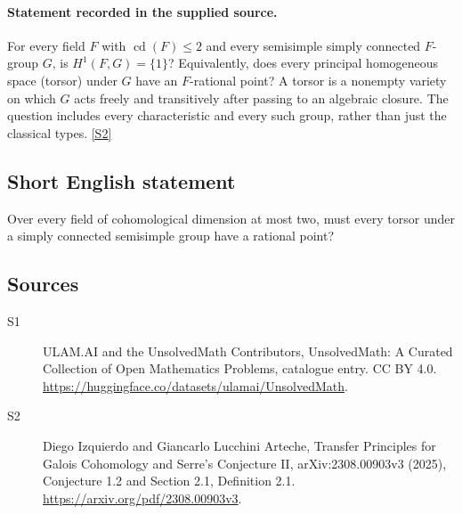 \documentclass[11pt]{article}
\newcommand{\sref}[2]{\hyperlink{source:#1:#2}{[S#2]}}
\begin{document}
\paragraph{Statement recorded in the supplied source.}
For every field $F$ with $\operatorname{cd}(F)\le2$ and every semisimple simply connected $F$-group $G$, is $H^1(F,G)=\{1\}$? Equivalently, does every principal homogeneous space (torsor) under $G$ have an $F$-rational point? A torsor is a nonempty variety on which $G$ acts freely and transitively after passing to an algebraic closure. The question includes every characteristic and every such group, rather than just the classical types. \sref{statement}{2}
\subsection{Short English statement}
Over every field of cohomological dimension at most two, must every torsor under a simply connected semisimple group have a rational point?
\subsection{Sources}
\begin{description}
\item[\hypertarget{source:statement:1}{S1}] ULAM.AI and the UnsolvedMath Contributors, UnsolvedMath: A Curated Collection of Open Mathematics Problems, catalogue entry. CC BY 4.0. \url{https://huggingface.co/datasets/ulamai/UnsolvedMath}.
\item[\hypertarget{source:statement:2}{S2}] Diego Izquierdo and Giancarlo Lucchini Arteche, Transfer Principles for Galois Cohomology and Serre’s Conjecture II, arXiv:2308.00903v3 (2025), Conjecture 1.2 and Section 2.1, Definition 2.1. \url{https://arxiv.org/pdf/2308.00903v3}.
\end{description}
\label{end:statement}
\end{document}
